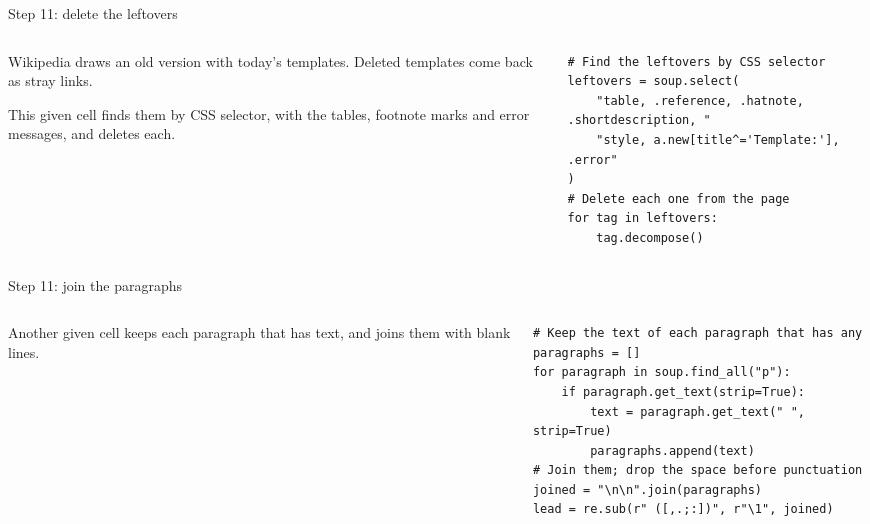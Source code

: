 \documentclass[9pt,aspectratio=169]{beamer}
\begin{document}
\begin{frame}[fragile]{Step 11: delete the leftovers}
    \begin{columns}[T]
        \begin{column}{0.37\textwidth}
            Wikipedia draws an old version with today's templates. Deleted templates come back as stray links.

            \medskip
            This given cell finds them by CSS selector, with the tables, footnote marks and error messages, and deletes each.
        \end{column}
        \begin{column}{0.6\textwidth}
\begin{lstlisting}
# Find the leftovers by CSS selector
leftovers = soup.select(
    "table, .reference, .hatnote, .shortdescription, "
    "style, a.new[title^='Template:'], .error"
)
# Delete each one from the page
for tag in leftovers:
    tag.decompose()
\end{lstlisting}
        \end{column}
    \end{columns}
\end{frame}

\begin{frame}[fragile]{Step 11: join the paragraphs}
    \begin{columns}[T]
        \begin{column}{0.37\textwidth}
            Another given cell keeps each paragraph that has text, and joins them with blank lines.
        \end{column}
        \begin{column}{0.6\textwidth}
\begin{lstlisting}
# Keep the text of each paragraph that has any
paragraphs = []
for paragraph in soup.find_all("p"):
    if paragraph.get_text(strip=True):
        text = paragraph.get_text(" ", strip=True)
        paragraphs.append(text)
# Join them; drop the space before punctuation
joined = "\n\n".join(paragraphs)
lead = re.sub(r" ([,.;:])", r"\1", joined)
\end{lstlisting}
        \end{column}
    \end{columns}
\end{frame}
\end{document}
